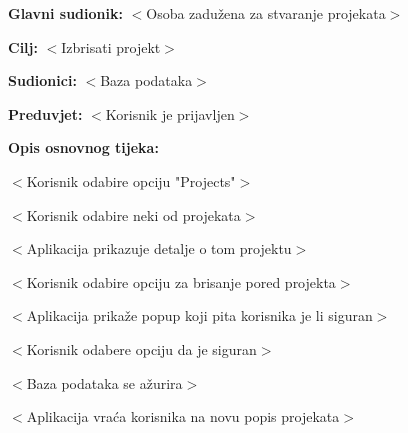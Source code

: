 					\noindent {}
					\begin{packed_item}
					
						\item \textbf{Glavni sudionik:} $<$Osoba zadužena za stvaranje projekata$>$
						\item \textbf{Cilj:} $<$Izbrisati projekt$>$
						\item \textbf{Sudionici:} $<$Baza podataka$>$
						\item \textbf{Preduvjet:} $<$Korisnik je prijavljen$>$
						\item \textbf{Opis osnovnog tijeka:}
					
						\item[] \begin{packed_enum}

							\item $<$Korisnik odabire opciju "Projects"$>$
							\item $<$Korisnik odabire neki od projekata$>$
							\item $<$Aplikacija prikazuje detalje o tom projektu$>$
							\item $<$Korisnik odabire opciju za brisanje pored projekta$>$
							\item $<$Aplikacija prikaže popup koji pita korisnika je li siguran$>$
							\item $<$Korisnik odabere opciju da je siguran$>$
							\item $<$Baza podataka se ažurira$>$
							\item $<$Aplikacija vraća korisnika na novu popis projekata$>$
						\end{packed_enum}
					
					\end{packed_item}

